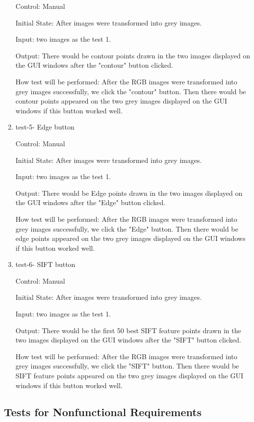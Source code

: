 \documentclass[12pt, titlepage]{article}
\begin{document}
\begin{enumerate}
Control: Manual 
					
Initial State: After images were transformed into grey images.
					
Input: two images as the test 1.
					
Output: There would be contour points drawn in the two images displayed on the GUI windows after the "contour" button clicked.


How test will be performed:  After the RGB images were transformed into grey images successfully, we click the "contour" button. Then there would be contour points appeared on the two grey images displayed on the GUI windows if this button worked well.
\item{test-5- Edge button\\}

Control: Manual 
					
Initial State: After images were transformed into grey images.
					
Input: two images as the test 1.
					
Output: There would be Edge points drawn in the two images displayed on the GUI windows after the "Edge" button clicked.


How test will be performed:  After the RGB images were transformed into grey images successfully, we click the "Edge" button. Then there would be edge points appeared on the two grey images displayed on the GUI windows if this button worked well.
\item{test-6- SIFT button\\}

Control: Manual 
					
Initial State: After images were transformed into grey images.
					
Input: two images as the test 1.
					
Output: There would be the first 50 best SIFT feature points drawn in the two images displayed on the GUI windows after the "SIFT" button clicked.


How test will be performed:  After the RGB images were transformed into grey images successfully, we click the "SIFT" button. Then there would be SIFT feature points appeared on the two grey images displayed on the GUI windows if this button worked well.
\end{enumerate}


\subsection{Tests for Nonfunctional Requirements}
\end{document}
